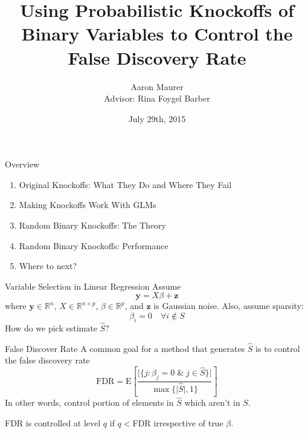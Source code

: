 \documentclass{beamer}
\title{Using Probabilistic Knockoffs of Binary Variables to Control the False Discovery Rate}
\author{Aaron Maurer \\ Advisor: Rina Foygel Barber}
\date{July 29th, 2015}
\newcommand{\R}{\mathbb{R}}
\newcommand{\E}{\mathrm{E}}
\begin{document}
\begin{frame}[plain]
    \titlepage
\end{frame}

\begin{frame}{Overview}
    \begin{enumerate} 
        \item Original Knockoffs: What They Do and Where They Fail
        \item Making Knockoffs Work With GLMs
        \item Random Binary Knockoffs: The Theory
        \item Random Binary Knockoffs: Performance
        \item Where to next?
    \end{enumerate}
\end{frame}

\begin{frame}{Variable Selection in Linear Regression}
    Assume
     \[\mathbf{y} = X\beta + \mathbf{z}\]
    where $\mathbf{y}\in\R^n$, $X \in \R^{n\times p}$, $\beta\in\R^p$, and $\mathbf z$ is Gaussian noise. Also, assume sparsity:
    \[\beta_i = 0 \quad \forall i\not\in S\]
    How do we pick estimate $\hat S$?
\end{frame}

\begin{frame}{False Discover Rate}
    A common goal for a method that generates $\hat S$ is to control the false discovery rate
    \[ \textrm{FDR} = \E\left[\frac{\vert{\{j: \beta_j=0 \; \& \; j\in\hat S\}}\vert}{\max\{\vert{\hat S}\vert,1\}} \right] \]
    In other words, control portion of elements in $\hat S$ which aren't in $S$. \par
    \vspace{1cm}
    FDR is controlled at level $q$ if $q<$FDR irrespective of true $\beta$.
    
\end{frame}
\end{document}

